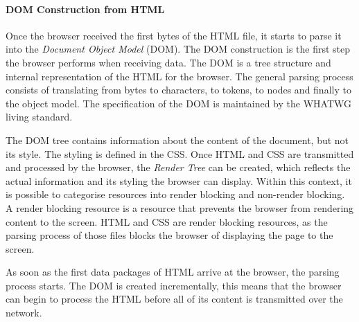 \paragraph{DOM Construction from HTML}


Once the browser received the first bytes of the HTML file, it starts to parse it into the \textit{Document Object Model} (DOM).
The DOM construction is the first step the browser performs when receiving data.
The DOM is a tree structure and internal representation of the HTML for the browser. %
The general parsing process consists of translating from bytes to characters, to tokens, to nodes and finally to the object model.%
The specification of the DOM is maintained by the WHATWG living standard. %




The DOM tree contains information about the content of the document, but not its style.
The styling is defined in the CSS.
Once HTML and CSS are transmitted and processed by the browser, the \textit{Render Tree} can be created, which reflects the actual information and its styling the browser can display.
Within this context, it is possible to categorise resources into render blocking and non-render blocking.
A render blocking resource is a resource that prevents the browser from rendering content to the screen.
HTML and CSS are render blocking resources, as the parsing process of those files blocks the browser of displaying the page to the screen.%




As soon as the first data packages of HTML arrive at the browser, the parsing process starts. %
The DOM is created incrementally,  this means that the browser can begin to process the HTML before all of its content is transmitted over the network.


